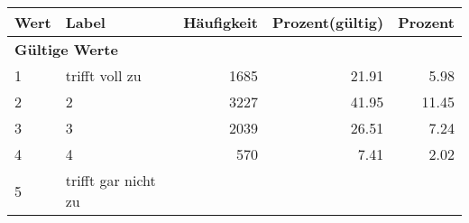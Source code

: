      \begin{longtable}{lXrrr}
     \toprule
     \textbf{Wert} & \textbf{Label} & \textbf{Häufigkeit} & \textbf{Prozent(gültig)} & \textbf{Prozent} \\
     \endhead
     \midrule
     \multicolumn{5}{l}{\textbf{Gültige Werte}}\\

     1 &
     \multicolumn{1}{X}{ trifft voll zu   } &


       \num{1685} &
       \num[round-mode=places,round-precision=2]{21.91} &
         \num[round-mode=places,round-precision=2]{5.98} \\

     2 &
     \multicolumn{1}{X}{ 2   } &


       \num{3227} &
       \num[round-mode=places,round-precision=2]{41.95} &
         \num[round-mode=places,round-precision=2]{11.45} \\

     3 &
     \multicolumn{1}{X}{ 3   } &


       \num{2039} &
       \num[round-mode=places,round-precision=2]{26.51} &
         \num[round-mode=places,round-precision=2]{7.24} \\

     4 &
     \multicolumn{1}{X}{ 4   } &


       \num{570} &
       \num[round-mode=places,round-precision=2]{7.41} &
         \num[round-mode=places,round-precision=2]{2.02} \\

     5 &
     \multicolumn{1}{X}{ trifft gar nicht zu   } &



\end{longtable}
